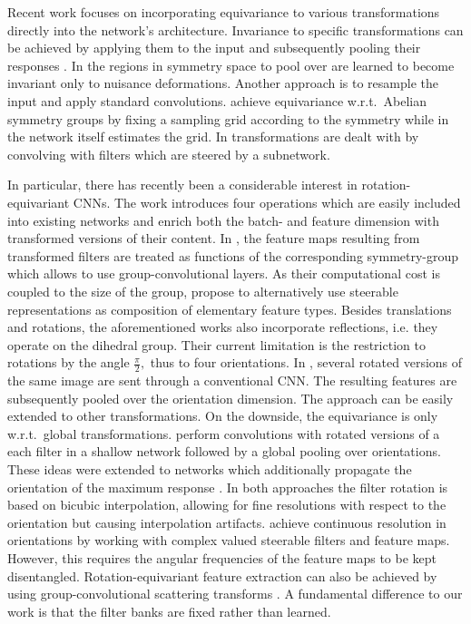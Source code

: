 \documentclass[10pt,twocolumn,letterpaper]{article}
\begin{document}
Recent work focuses on incorporating equivariance to various transformations directly into the network's architecture.
Invariance to specific transformations can be achieved by applying them to the input and subsequently pooling their responses \cite{ICML2012Sohn_659, DBLP:journals/corr/KanazawaSJ14, zhang2015discriminative}.
In \cite{NIPS2014_5424} the regions in symmetry space to pool over are learned to become invariant only to nuisance deformations.
Another approach is to resample the input and apply standard convolutions.
\citet{pmlr-v70-henriques17a} achieve equivariance w.r.t.~Abelian symmetry groups by fixing a sampling grid according to the symmetry while in \cite{DBLP:journals/corr/JaderbergSZK15,lin2016inverse} the network itself estimates the grid.
In \cite{jacobsen2017dynamic} transformations are dealt with by convolving with filters which are steered by a subnetwork.

In particular, there has recently been a considerable interest in rotation-equivariant \mbox{CNNs}.
The work \cite{dieleman2016exploiting} introduces four operations which are easily included into existing networks and enrich both the batch- and feature dimension with transformed versions of their content.
In \cite{cohen2016group}, the feature maps resulting from transformed filters are treated as functions of the corresponding symmetry-group which allows to use group-convolutional layers.
As their computational cost is coupled to the size of the group, \citet{cohen2016steerable} propose to alternatively use steerable representations as composition of elementary feature types.
Besides translations and rotations, the aforementioned works also incorporate reflections, i.e. they operate on the dihedral group.
Their current limitation is the restriction to rotations by the angle $\frac{\pi}{2},$ thus to four orientations.
In \cite{laptev2016ti}, several rotated versions of the same image are sent through a conventional CNN. The resulting features are subsequently pooled over the orientation dimension.
The approach can be easily extended to other transformations.
On the downside, the equivariance is only w.r.t.~global transformations.
\citet{marcos2016learning} perform convolutions with rotated versions of a each filter in a shallow network followed by a global pooling over orientations.
These ideas were extended to networks which additionally propagate the orientation of the maximum response \cite{marcos2016rotation}.
In both approaches the filter rotation is based on bicubic interpolation, allowing for fine resolutions with respect to the orientation but causing interpolation artifacts.
\citet{worrall2016harmonic} achieve continuous resolution in orientations by working with complex valued steerable filters and feature maps.
However, this requires the angular frequencies of the feature maps to be kept disentangled.
Rotation-equivariant feature extraction can also be achieved by using group-convolutional scattering transforms \cite{sifre2013rotation}.
A fundamental difference to our work is that the filter banks are fixed rather than learned.
\end{document}
